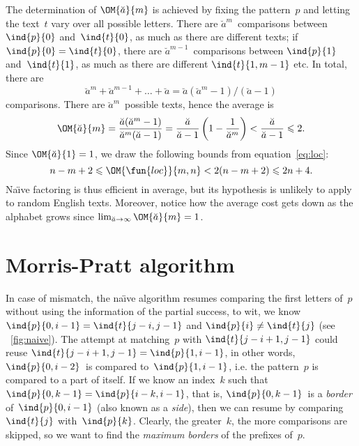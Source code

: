 The determination of \(\OM{\breve{a}}{m}\) is achieved by fixing the
pattern~\(p\) and letting the text~\(t\) vary over all possible
letters. There are \(\breve{a}^{m}\)~comparisons between
\(\ind{p}{0}\) and~\(\ind{t}{0}\), as much as there are different
texts; if \(\ind{p}{0}=\ind{t}{0}\), there are
\(\breve{a}^{m-1}\)~comparisons between \(\ind{p}{1}\)
and~\(\ind{t}{1}\), as much as there are different \(\ind{t}{1,m-1}\)
etc. In total, there are
\begin{equation*}
\breve{a}^{m} + \breve{a}^{m-1} + \dots +
\breve{a} = \breve{a}(\breve{a}^{m} - 1)/(\breve{a}-1)
\end{equation*}
comparisons. There are \(\breve{a}^m\)~possible texts, hence the
average is
\begin{equation*}
\OM{\breve{a}}{m}
 = \frac{\breve{a}(\breve{a}^{m}-1)}{\breve{a}^m(\breve{a}-1)}
 = \frac{\breve{a}}{\breve{a}-1}\left(1
                          - \frac{1}{\breve{a}^{m}}\right)
 < \frac{\breve{a}}{\breve{a}-1}
 \leqslant 2.
\end{equation*}
Since \(\OM{\breve{a}}{1} = 1\), we draw the following bounds from
equation~\eqref{eq:loc}:
\begin{equation*}
n - m + 2 \leqslant \OM{\fun{loc}}{m,n} < 2(n-m+2) \leqslant 2n + 4.
\end{equation*}
Na\"{\i}ve factoring is thus efficient in average, but its hypothesis
is unlikely to apply to random English texts. Moreover, notice how the
average cost gets down as the alphabet grows since \(\lim_{\breve{a}
  \to \infty}\OM{\breve{a}}{m} = 1\). 


\section{Morris-Pratt algorithm}

In case of mismatch, the na\"{\i}ve algorithm resumes comparing the
first letters of~\(p\) without using the information of the partial
success, to wit, we know \(\ind{p}{0,i-1} = \ind{t}{j-i,j-1}\) and
\(\ind{p}{i} \neq \ind{t}{j}\) (see \fig~\vref{fig:naive}).  The
attempt at matching~\(p\) with \(\ind{t}{j-i+1,j-1}\) could reuse
\(\ind{t}{j-i+1,j-1} = \ind{p}{1,i-1}\), in other words,
\(\ind{p}{0,i-2}\)~is compared to~\(\ind{p}{1,i-1}\), i.e. the
pattern~\(p\) is compared to a part of itself. If we know an
index~\(k\) such that \(\ind{p}{0,k-1} = \ind{p}{i-k,i-1}\), that is,
\(\ind{p}{0,k-1}\)~is a \emph{border} of~\(\ind{p}{0,i-1}\) (also
known as a \emph{side}), then
we can resume by comparing~\(\ind{t}{j}\)
with~\(\ind{p}{k}\). Clearly, the greater~\(k\), the more comparisons
are skipped, so we want to find the \emph{maximum borders} of the
prefixes of~\(p\).

